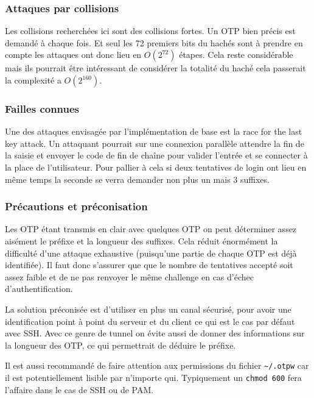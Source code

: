 \documentclass{../res/univ-projet}
\begin{document}
\subsubsection{Attaques par collisions}
    Les collisions recherchées ici sont des collisions fortes. Un OTP bien précis est demandé à
    chaque fois. Et seul les 72 premiers bits du hachés sont à prendre en compte les attaques ont
    donc lieu en $O(2^{72})$ étapes. Cela reste considérable mais ils pourrait être intéressant de 
    considérer la totalité du haché cela passerait la complexité a $O(2^{160})$.
    
\subsubsection{Failles connues} 
        Une des attaques envisagée par l'implémentation de base est la \og race for the last key attack.\fg{}
    Un attaquant pourrait sur une connexion parallèle attendre la fin de la saisie et envoyer
    le code de fin de chaîne pour valider l'entrée et se connecter à la place de l'utilisateur.
    Pour pallier à cela si deux tentatives de login ont lieu en même temps la seconde se verra demander
    non plus un mais 3 suffixes.

\subsubsection{Précautions et préconisation}
        Les OTP étant transmis en clair avec quelques OTP on peut déterminer assez
    aisément le préfixe et la longueur des suffixes. Cela réduit énormément la
    difficulté d'une attaque exhaustive (puisqu'une partie de chaque OTP est déjà identifiée).
    Il faut donc s'assurer que que le nombre de tentatives accepté soit assez faible et de ne 
    pas renvoyer le même challenge en cas d'échec d'authentification.

        La solution préconisée est d'utiliser en plus un canal sécurisé, pour avoir une 
    identification point à point du serveur et du client ce qui est le cas par défaut avec
    SSH. Avec ce genre de tunnel on évite aussi de donner des informations sur la longueur des
    OTP, ce qui permettrait de déduire le préfixe.

        Il est aussi recommandé de faire attention aux permissions du fichier \verb?~/.otpw? car
    il est potentiellement lisible par n'importe qui. Typiquement un \verb?chmod 600? fera l'affaire
    dans le cas de SSH ou de PAM.
\end{document}

